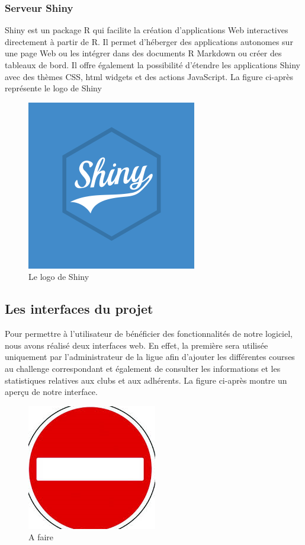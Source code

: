 \documentclass[12pt,a4paper]{report}
\begin{document}
\subsubsection {Serveur Shiny}
Shiny est un package R qui facilite la création d'applications Web interactives directement à partir de R. Il permet d’héberger des applications autonomes sur une page Web ou les intégrer dans des documents R Markdown ou créer des tableaux de bord. Il offre également la possibilité d’étendre les applications Shiny avec des thèmes CSS, html widgets et des actions JavaScript. La figure ci-après représente le logo de Shiny 
\begin{figure}
	  \center
	  \includegraphics[scale=0.5]{Shiny_logo.png}
	   \caption {Le logo de Shiny}
\end{figure}
  

\subsection {Les interfaces du projet }
Pour permettre à l’utilisateur de bénéficier des fonctionnalités de notre logiciel, nous avons réalisé deux interfaces web. En effet, la première sera utilisée uniquement par l’administrateur de la ligue afin d’ajouter les différentes courses au challenge correspondant et également de consulter les informations et les statistiques relatives aux clubs et aux adhérents.
La figure ci-après montre un aperçu de notre interface. 

\begin{figure}
	  \center
	  \includegraphics[scale=0.5]{A_faire.png}
	   \caption {A faire }
\end{figure}
\end{document}
